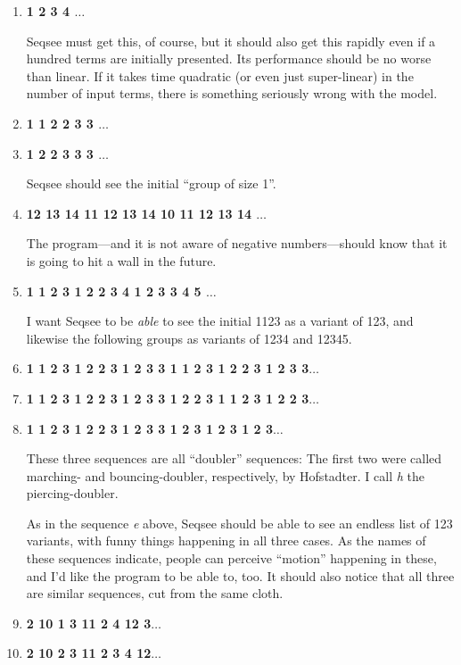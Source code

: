 \documentclass[letterpaper]{article}
\begin{document}
\renewcommand{\theenumi}{\alph{enumi}}
\begin{enumerate}
\item \textbf{1 2 3 4 $\ldots$}

Seqsee must get this, of course, but it should also get this rapidly even if a hundred terms are initially presented. Its performance should be no worse than linear. If it takes time quadratic (or even just super-linear) in the number of input terms, there is something seriously wrong with the model.

\item \textbf{ 1 1 2 2 3 3 $\ldots$}
\item \textbf{ 1 2 2 3 3 3 $\ldots$}

Seqsee should see the initial ``group of size 1''.

\item \textbf{12 13 14 11 12 13 14 10 11 12 13 14 $\ldots$}

The program---and it is not aware of negative numbers---should know that it is going to hit a wall in the future.

\item \textbf{1 1 2 3 1 2 2 3 4 1 2 3 3 4 5 $\ldots$}

I want Seqsee to be \emph{able} to see the initial 1123 as a variant of 123, and likewise the following groups as variants of 1234 and 12345.

\item \textbf{1 1 2 3 1 2 2 3 1 2 3 3 1 1 2 3 1 2 2 3 1 2 3 3$\ldots$}
\item \textbf{1 1 2 3 1 2 2 3 1 2 3 3 1 2 2 3 1 1 2 3 1 2 2 3$\ldots$}
\item \textbf{1 1 2 3 1 2 2 3 1 2 3 3 1 2 3 1 2 3 1 2 3$\ldots$}

These three sequences are all ``doubler'' sequences: The first two were called marching- and bouncing-doubler, respectively, by Hofstadter. I call \emph{h} the piercing-doubler.

As in the sequence \emph{e} above, Seqsee should be able to see an endless list of 123 variants, with funny things happening in all three cases. As the names of these sequences indicate, people can perceive ``motion'' happening in these, and I'd like the program to be able to, too. It should also notice that all three are similar sequences, cut from the same cloth.

\item \textbf{ 2 10 1 3 11 2 4 12 3$\ldots$}
\item \textbf{ 2 10 2 3 11 2 3 4 12$\ldots$}


\end{enumerate}
\end{document}
